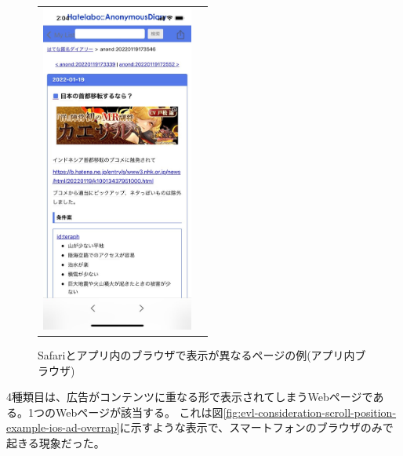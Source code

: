 \begin{figure}[htbp]
\begin{tabular}{cc}
    \begin{minipage}[t]{0.45\hsize}
      \caption{Safariとアプリ内のブラウザで表示が異なるページの例(アプリ内ブラウザ)}
      \label{fig:evl-consideration-scroll-position-ios-diff-wkwebview}
      \begin{center}
        \includegraphics[bb=0 0 585 1266,width=5cm]{img/060_evaluation/consideration/scroll_position/example/ios-diff-wkwebview.pdf}
      \end{center}
    \end{minipage}
  \end{tabular}
\end{figure}

4種類目は、広告がコンテンツに重なる形で表示されてしまうWebページである。1つのWebページが該当する。
これは図\ref{fig:evl-consideration-scroll-position-example-ios-ad-overrap}に示すような表示で、スマートフォンのブラウザのみで起きる現象だった。

